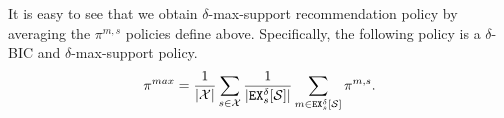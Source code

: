 It is easy to see that we obtain $\delta$-max-support recommendation policy by averaging the $\pi^{m,s}$ policies define above.
Specifically, the following policy is a $\delta$-BIC and $\delta$-max-support policy.
\begin{align}
\label{eq:pimax2}
\pi^{max} = \frac{1}{|\mathcal{X}|} \sum_{s \in \mathcal{X}} \frac{1}{|\mathtt{EX}_s^{\delta}[\mathcal{S}]|} \sum_{m \in \mathtt{EX}_s^{\delta}[\mathcal{S}]} \pi^{m,s}.
\end{align}

\begin{comment}
Sometimes the term $\Pr[s'|\omega]$ in the above LP (i.e. the probability of seeing signal $s'$ given state to be $\omega$) is hard to compute. On the other hand, it could be easy to get a approximation of $\Pr[s'|\omega]$ as $p(s',\omega)$ such that $|p(s',w) -\Pr[s'|\omega]| \leq \beta$ for all $s',\omega$. Then we can solve a modified LP using $p(s',\omega)$ instead of $\Pr[s'|\omega]$:

\begin{figure}[H]
\begin{mdframed}
\begin{alignat*}{2}
 & \textbf{maximize }    x_{m,s}\  \\
&  \textbf{subject to: }\\
 & \sum_{\omega \in \varOmega, s' \in \X} \Pr[\omega] \cdot p(s,\omega) \cdot \left(u(\theta, m'(\theta), \omega) - u(\theta, m''(\theta), \omega)\right) \cdot x_{m',s'} \geq -\delta-\beta |\X|   &\ & \forall m',m'' \in \M, \theta \in \varTheta \\
& \sum_{m'\in \M} x_{m',s'} = 1,  \ &\ & \forall s' \in \X \\
& x_{m',s'} \geq 0,  \ &\ & \forall s' \in \X, m'\in \M \\
\end{alignat*}
\end{mdframed}
\label{fig:nocc_lp_a}
\end{figure}

For the modified LP, we have the following claim:
\begin{claim}
\label{clm:nocc_lp_a}
For a given signal $s \in \X$, if a menu $m \in \M$ is $\delta$-signal-explorable, the above LP has a positive solution. When the LP has a positive solution, define $\pi^{m,s}$ as $\Pr[\pi^{m,s}(s') = m'] = x_{m',s', } \forall m' \in \M, s' \in \X$. Then $\pi^{m,s}$ is a single-round $(\delta+2\beta|\X|)$-BIC recommendation policy such that $\Pr[\pi^{m,s}(s) = m] > 0$
\end{claim}


\end{comment}
